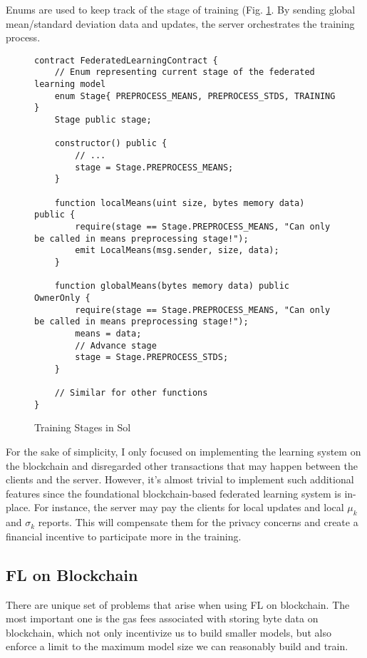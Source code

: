 Enums are used to keep track of the stage of training (Fig. \ref{fig:stages}.
By sending global mean/standard deviation data and updates, the server orchestrates the training process.

\begin{figure}[h]
    \begin{verbatim}
contract FederatedLearningContract {
    // Enum representing current stage of the federated learning model
    enum Stage{ PREPROCESS_MEANS, PREPROCESS_STDS, TRAINING }
    Stage public stage;
    
    constructor() public {
        // ...
        stage = Stage.PREPROCESS_MEANS;
    }

    function localMeans(uint size, bytes memory data) public {
        require(stage == Stage.PREPROCESS_MEANS, "Can only be called in means preprocessing stage!");
        emit LocalMeans(msg.sender, size, data);
    }
    
    function globalMeans(bytes memory data) public OwnerOnly {
        require(stage == Stage.PREPROCESS_MEANS, "Can only be called in means preprocessing stage!");
        means = data;
        // Advance stage
        stage = Stage.PREPROCESS_STDS;
    }
    
    // Similar for other functions
}
    \end{verbatim}
    \caption{Training Stages in Sol}
    \label{fig:stages}
\end{figure}


For the sake of simplicity, I only focused on implementing the learning system on the blockchain and disregarded other transactions that may happen between the clients and the server.
However, it's almost trivial to implement such additional features since the foundational blockchain-based federated learning system is in-place.
For instance, the server may pay the clients for local updates and local $\mu_k$ and $\sigma_k$ reports.
This will compensate them for the privacy concerns and create a financial incentive to participate more in the training.


\subsection{FL on Blockchain}

There are unique set of problems that arise when using FL on blockchain.
The most important one is the gas fees associated with storing byte data on blockchain, which not only incentivize us to build smaller models, but also enforce a limit to the maximum model size we can reasonably build and train.

